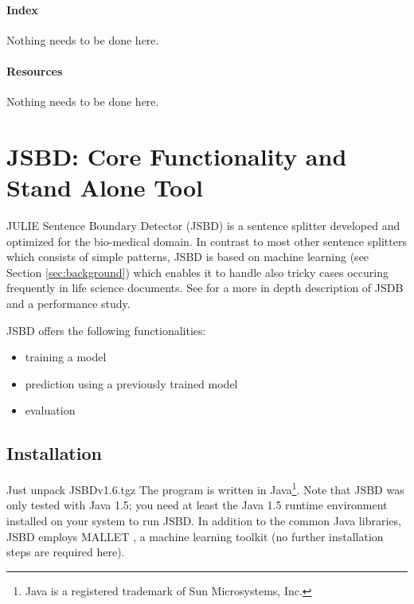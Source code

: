 \documentclass[11pt,a4paper,halfparskip]{scrartcl}
\begin{document}
\paragraph{Index}
Nothing needs to be done here.

\paragraph{Resources}
Nothing needs to be done here.




\clearpage
\section{JSBD: Core Functionality and Stand Alone Tool}
\label{sec_objective}

JULIE Sentence Boundary Detector (JSBD) is a sentence splitter
developed and optimized for the bio-medical domain. In contrast to
most other sentence splitters which consists of simple patterns, JSBD
is based on machine learning (see Section \ref{sec:background}) which
enables it to handle also tricky cases occuring frequently in life
science documents. See \cite{tomanek.medinfo07} for a more in depth
description of JSDB and a performance study.


JSBD offers the following functionalities:
\begin{itemize}
\item training a model
\item prediction using a previously trained model
\item evaluation
\end{itemize}





\subsection{Installation}
Just unpack JSBDv1.6.tgz The program is written in Java\footnote{Java
  is a registered trademark of Sun Microsystems, Inc.}. Note that JSBD
was only tested with Java 1.5; you need at least the Java 1.5 runtime
environment installed on your system to run JSBD. In addition to the
common Java libraries, JSBD employs \textsc{MALLET} \cite{mallet}, a
machine learning toolkit (no further installation steps are
required here).
\end{document}
